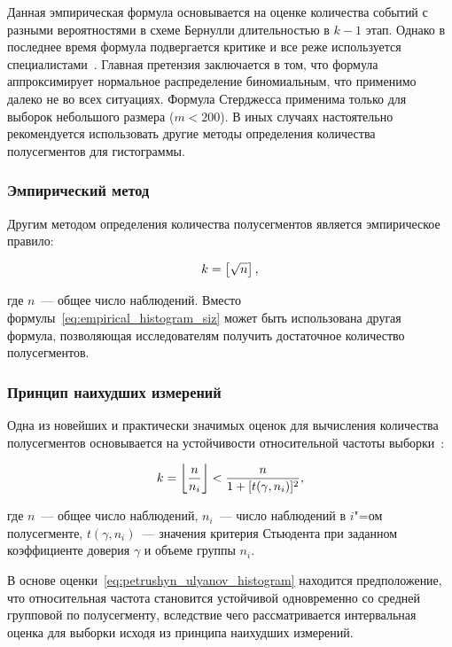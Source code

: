 \documentclass[a4paper, article, 14pt]{extarticle}
\begin{document}
Данная эмпирическая формула основывается на оценке количества событий с разными вероятностями в схеме Бернулли длительностью в $k - 1$ этап. Однако в последнее время формула подвергается критике и все реже используется специалистами~\cite{hyndman}. Главная претензия заключается в том, что формула аппроксимирует нормальное распределение биномиальным, что применимо далеко не во всех ситуациях. Формула Стерджесса применима только для выборок небольшого размера ($m < 200$). В иных случаях настоятельно рекомендуется использовать другие методы определения количества полусегментов для гистограммы.

\subsubsection{Эмпирический метод}\label{sec:empirical_histogram_size_scott}

Другим методом определения количества полусегментов является эмпирическое правило:

\begin{equation}\label{eq:empirical_histogram_siz}
	k = \round{\sqrt{n}},
\end{equation}

\noindent где $n$~--- общее число наблюдений. Вместо формулы~\eqref{eq:empirical_histogram_siz} может быть использована другая формула, позволяющая исследователям получить достаточное количество полусегментов.

\subsubsection{Принцип наихудших измерений}\label{sec:frequency_histogram_size_worst_case}

Одна из новейших и практически значимых оценок для вычисления количества полусегментов основывается на устойчивости относительной частоты выборки~\cite{petrushyn_ulyanov_definitions}:

\begin{equation}\label{eq:petrushyn_ulyanov_histogram}
	k = \floor*{\frac{n}{n_i}} < \frac{n}{1 + [t(\gamma, n_i)]^2},
\end{equation}

\noindent где $n$~--- общее число наблюдений, $n_i$~--- число наблюдений в $i$"=ом полусегменте, $t(\gamma, n_i)$~--- значения критерия Стьюдента при заданном коэффициенте доверия $\gamma$ и объеме группы $n_i$.

В основе оценки~\eqref{eq:petrushyn_ulyanov_histogram} находится предположение, что относительная частота становится устойчивой одновременно со средней групповой по полусегменту, вследствие чего рассматривается интервальная оценка для выборки исходя из принципа наихудших измерений.
\end{document}
